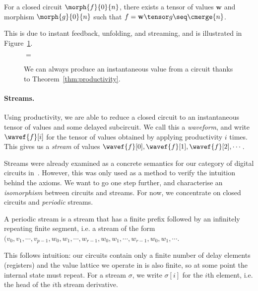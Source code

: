 \documentclass[11pt,numbib]{article}
\begin{document}
\begin{theorem}[Productivity]\label{thm:productivity}
    For a closed circuit $\morph{f}{0}{n}$, there exists a tensor of values $\textbf{w}$ and morphism $\morph{g}{0}{n}$ such that $f = \textbf{w} \tensor g \seq \cmerge{n}$.
\end{theorem}

\noindent
This is due to instant feedback, unfolding, and streaming, and is illustrated in Figure~\ref{fig:productivity}.

\begin{figure}[t]
    \centering
    \quad$=$\quad
    \caption{We can always produce an instantaneous value from a circuit thanks to Theorem~\ref{thm:productivity}.}
    \label{fig:productivity}
\end{figure}

\paragraph*{Streams.}

Using productivity, we are able to reduce a closed circuit to an instantaneous tensor of values and some delayed subcircuit.
We call this a \emph{waveform}, and write $\wavef{f}[i]$ for the tensor of values obtained by applying productivity $i$ times.
This gives us a \emph{stream} of values $\wavef{f}[0],\wavef{f}[1],\wavef{f}[2], \cdots$.

Streams were already examined as a concrete semantics for our category of digital circuits in~\parencite[Section 2.4]{ghica2017diagrammatictech}.
However, this was only used as a method to verify the intuition behind the axioms.
We want to go one step further, and characterise an \emph{isomorphism} between circuits and streams.
For now, we concentrate on closed circuits and \emph{periodic} streams.

\begin{definition}
    A periodic stream is a stream that has a finite prefix followed by an infinitely repeating finite segment, i.e. a stream of the form $(v_0,v_1,\cdots,v_{p-1},w_{0},w_{1}, \cdots,w_{r-1},w_{0},w_{1},\cdots,w_{r-1},w_{0},w_{1},\cdots$.
\end{definition}

\noindent
This follows intuition: our circuits contain only a finite number of delay elements (registers) and the value lattice we operate in is also finite, so at some point the internal state must repeat.
For a stream $\sigma$, we write $\sigma[i]$ for the $i$th element, i.e. the head of the $i$th stream derivative.
\end{document}

